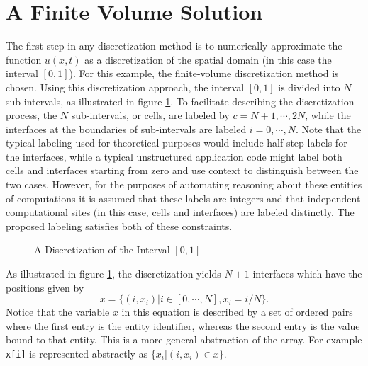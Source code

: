 \documentclass[10pt,epsf]{book}
\begin{document}
\section{A Finite Volume Solution}

The first step in any discretization method is to numerically
approximate the function $u(x,t)$ as a discretization of the
spatial domain (in this case the interval $[0,1]$).  For this example,
the finite-volume discretization method is chosen.  Using
this discretization approach, the interval $[0,1]$ is divided into $N$
sub-intervals, as illustrated in figure \ref{fig3:oned}.  To
facilitate describing the discretization process, the $N$
sub-intervals, or cells, are labeled by $c = N+1, \cdots, 2N$, while
the interfaces at the boundaries of sub-intervals are labeled $i = 0,
\cdots, N$.  Note that the typical labeling used for theoretical
purposes would include half step labels for the interfaces, while a
typical unstructured application code might label both cells and
interfaces starting from zero and use context to distinguish between
the two cases.  However, for the purposes of automating reasoning
about these entities of computations it is assumed that these labels
are integers and that independent computational sites (in this case,
cells and interfaces) are labeled distinctly.  The proposed labeling
satisfies both of these constraints.

\begin{figure}[htbp]
 \centerline{
  \epsfxsize=5.50in
  }
 \caption{A Discretization of the Interval $[0,1]$}
 \label{fig3:oned}
\end{figure}

As illustrated in figure \ref{fig3:oned}, the discretization yields
$N+1$ interfaces which have the positions given by
\begin{equation}
x = \lbrace (i,x_i) | i \in [0, \cdots, N], x_i = i/N \rbrace.
\label{eq3:interfacex}
\end{equation}
Notice that the variable $x$ in this equation is described by a set of
ordered pairs where the first entry is the entity identifier, whereas
the second entry is the value bound to that entity.  This is a more
general abstraction of the array.  For example {\tt x[i]} is
represented abstractly as $\lbrace x_i | (i,x_i) \in x \rbrace$.
\end{document}
